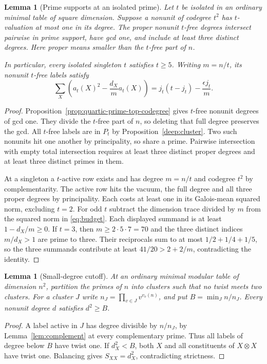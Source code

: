 \documentclass[11pt,a4paper]{article}
\numberwithin{equation}{section}
\newtheorem{lemma}[theorem]{Lemma}
\theoremstyle{remark}
\begin{document}
\begin{lemma}[Prime supports at an isolated prime]\label{fam:M:6.6}
\label{lem:isolated-dyadic-square}\label{new:trace}
Let $t$ be isolated in an ordinary minimal table of square dimension.
Suppose a nonunit of codegree $t^2$ has $t$-valuation at most one in
its degree. The proper nonunit $t$-free degrees intersect pairwise in
prime support, have gcd one, and include at least three distinct degrees.
Here proper means smaller than the $t$-free part of $n$.

In particular, every isolated singleton $t$ satisfies $t\ge5$.
Writing $m=n/t$, its nonunit $t$-free labels satisfy
\[
 \sum_X\left(a_t(X)^2-\frac{d_X}{m}a_t(X)\right)
       =j_t(t-j_t)-\frac{\epsilon j_t}{m}.
\]
\end{lemma}
\begin{proof}
Proposition~\ref{prop:quartic-prime-top-codegree} gives $t$-free
nonunit degrees of gcd one. They divide the $t$-free part of $n$,
so deleting that full degree preserves the gcd.
All $t$-free labels are in $P_t$ by Proposition~\ref{deep:cluster}.
Two such nonunits hit one another by principality, so share a prime.
Pairwise intersection with empty total intersection requires at least
three distinct proper degrees and at least three distinct primes in them.

At a singleton a $t$-active row exists and has degree $m=n/t$ and
codegree $t^2$ by complementarity.
The active row hits the vacuum, the full degree and all three
proper degrees by principality. Each costs at least one in its
Galois-mean squared norm, excluding $t=2$.
For odd $t$ subtract the dimension trace divided by $m$ from the
squared norm in \eqref{eq:budget}. Each displayed summand is at least
$1-d_X/m\ge0$. If $t=3$, then $m\ge2\cdot5\cdot7=70$ and the
three distinct indices $m/d_X>1$ are prime to three. Their
reciprocals sum to at most $1/2+1/4+1/5$, so the three summands
contribute at least $41/20>2+2/m$, contradicting the identity.
\end{proof}
\begin{lemma}[Small-degree cutoff]\label{fam:M:6.7}\label{lem:twist-cut}
At an ordinary minimal modular table of dimension \(n^2\), partition
the primes of \(n\) into clusters such that no twist meets two
clusters. For a cluster \(J\) write \(n_J=\prod_{v\in J}v^{v_v(n)}\),
and put \(B=\min_J n/n_J\). Every nonunit degree \(d\) satisfies \(d^2\ge B\).
\end{lemma}
\begin{proof}
A label active in \(J\) has degree divisible by \(n/n_J\), by
Lemma~\ref{lem:complement} at every complementary prime. Thus all
labels of degree below \(B\) have twist one. If \(d_X^2<B\), both
\(X\) and all constituents of \(X\otimes X\) have twist one.
Balancing gives \(S_{XX}=d_X^2\), contradicting strictness.
\end{proof}
\end{document}
